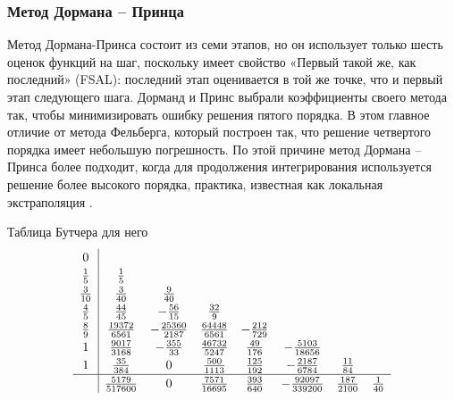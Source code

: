 \documentclass[a4paper,12pt]{article}
\begin{document}
	\subsubsection{Метод Дормана – Принца}
	
	Метод Дормана-Принса состоит из семи этапов, но он использует только шесть оценок функций на шаг, поскольку имеет свойство «Первый такой же, как последний» (FSAL): последний этап оценивается в той же точке, что и первый этап следующего шага. Дорманд и Принс выбрали коэффициенты своего метода так, чтобы минимизировать ошибку решения пятого порядка. В этом главное отличие от метода Фельберга, который построен так, что решение четвертого порядка имеет небольшую погрешность. По этой причине метод Дормана – Принса более подходит, когда для продолжения интегрирования используется решение более высокого порядка, практика, известная как локальная экстраполяция .

	Таблица Бутчера для него
	 \[
	 \renewcommand\arraystretch{1.2}
	 \begin{array}
	 	{c|ccccccc}
	 	0\\
	 	\frac{1}{5} & \frac{1}{5}\\
	 	\frac{3}{10} &\frac{3}{40} &\frac{9}{40} \\
		\frac{4}{5} &\frac{44}{45} &-\frac{56}{15} &\frac{32}{9} \\
		\frac{8}{9} &\frac{19372}{6561} &-\frac{25360}{2187} &\frac{64448}{6561} &-\frac{212}{729} \\
		1&\frac{9017}{3168} &-\frac{355}{33} &\frac{46732}{5247} &\frac{49}{176} &-\frac{5103}{18656} \\
	 	1&\frac{35}{384} &0 &\frac{500}{1113} &\frac{125}{192} &-\frac{2187}{6784}&\frac{11}{84} \\
	 	\hline
	 	& \frac{5179}{517600} &0 &\frac{7571}{16695} &\frac{393}{640} &-\frac{92097}{339200} &\frac{187}{2100} &\frac{1}{40} 
	 \end{array}
	 \]
\end{document}
